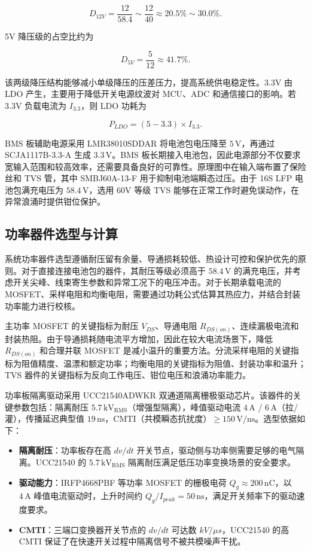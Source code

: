 \[
D_{12V}=\frac{12}{58.4}\sim\frac{12}{40}
\approx20.5\%\sim30.0\%.
\]

5V 降压级的占空比约为

\[
D_{5V}=\frac{5}{12}\approx41.7\%.
\]

该两级降压结构能够减小单级降压的压差压力，提高系统供电稳定性。3.3V 由 LDO 产生，主要用于降低开关电源纹波对 MCU、ADC 和通信接口的影响。若 3.3V 负载电流为 $I_{3.3}$，则 LDO 功耗为

\[
P_{LDO}=(5-3.3)\times I_{3.3}.
\]

BMS 板辅助电源采用 LMR38010SDDAR 将电池包电压降至 $5\,\mathrm{V}$，再通过 SCJA1117B-3.3-A 生成 $3.3\,\mathrm{V}$。BMS 板长期接入电池包，因此电源部分不仅要求宽输入范围和较高效率，还需要具备良好的可靠性。原理图中在输入端布置了保险丝和 TVS 管，其中 SMBJ60A-13-F 用于抑制电池端瞬态过压。由于 16S LFP 电池包满充电压为 $58.4\,\mathrm{V}$，选用 60V 等级 TVS 能够在正常工作时避免误动作，在异常浪涌时提供钳位保护。

\subsection{功率器件选型与计算}

系统功率器件选型遵循耐压留有余量、导通损耗较低、热设计可控和保护优先的原则。对于直接连接电池包的器件，其耐压等级必须高于 $58.4\,\mathrm{V}$ 的满充电压，并考虑开关尖峰、线束寄生参数和异常工况下的电压冲击。对于长期承载电流的 MOSFET、采样电阻和均衡电阻，需要通过功耗公式估算其热应力，并结合封装功率能力进行校核。

主功率 MOSFET 的关键指标为耐压 $V_{DS}$、导通电阻 $R_{DS(on)}$、连续漏极电流和封装热阻。由于导通损耗随电流平方增加，因此在较大电流场景下，降低 $R_{DS(on)}$ 和合理并联 MOSFET 是减小温升的重要方法。分流采样电阻的关键指标为阻值精度、温漂和额定功率；均衡电阻的关键指标为阻值、封装功率和温升；TVS 器件的关键指标为反向工作电压、钳位电压和浪涌功率能力。

功率板隔离驱动采用 UCC21540ADWKR 双通道隔离栅极驱动芯片。该器件的关键参数包括：隔离耐压 $5.7\,\mathrm{kV_{RMS}}$（增强型隔离），峰值驱动电流 $4\,\mathrm{A}$ / $6\,\mathrm{A}$（拉/灌），传播延迟典型值 $19\,\mathrm{ns}$，CMTI（共模瞬态抗扰度）$\ge150\,\mathrm{V/ns}$。选型依据如下：

\begin{itemize}[leftmargin=*,itemsep=0.3ex]
  \item \textbf{隔离耐压}：功率板存在高 $dv/dt$ 开关节点，驱动侧与功率侧需要足够的电气隔离。UCC21540 的 $5.7\,\mathrm{kV_{RMS}}$ 隔离耐压满足低压功率变换场景的安全要求。
  \item \textbf{驱动能力}：IRFP4668PBF 等功率 MOSFET 的栅极电荷 $Q_g\approx200\,\mathrm{nC}$，以 $4\,\mathrm{A}$ 峰值电流驱动时，上升时间约 $Q_g/I_{peak}=50\,\mathrm{ns}$，满足开关频率下的驱动速度要求。
  \item \textbf{CMTI}：三端口变换器开关节点的 $dv/dt$ 可达数 $kV/\mu s$，UCC21540 的高 CMTI 保证了在快速开关过程中隔离信号不被共模噪声干扰。
\end{itemize}

